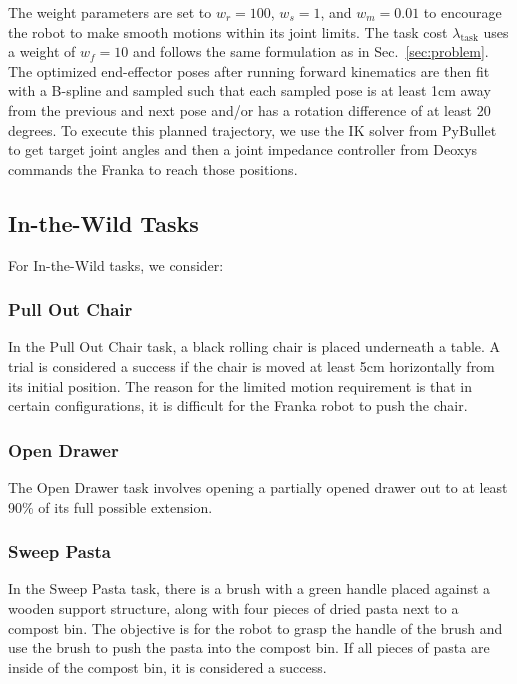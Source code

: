 The weight parameters are set to $w_r = 100$, $w_s = 1$, and $w_m = 0.01$ to encourage the robot to make smooth motions within its joint limits. The task cost $\lambda_{\text{task}}$ uses a weight of $w_f = 10$ and follows the same formulation as in Sec.~\ref{sec:problem}. The optimized end-effector poses after running forward kinematics are then fit with a B-spline and sampled such that each sampled pose is at least 1cm away from the previous and next pose and/or has a rotation difference of at least 20 degrees. To execute this planned trajectory, we use the IK solver from PyBullet~\cite{coumans2021pybullet} to get target joint angles and then a joint impedance controller from Deoxys~\cite{zhu2022viola} commands the Franka to reach those positions. 

\subsection{In-the-Wild Tasks}
\label{sec:in_the_wild_desc}

For In-the-Wild tasks, we consider:

\subsubsection{Pull Out Chair} 
In the Pull Out Chair task, a black rolling chair is placed underneath a table. 
A trial is considered a success if the chair is moved at least 5cm horizontally from its initial position. The reason for the limited motion requirement is that in certain configurations, it is difficult for the Franka robot to push the chair. 

\subsubsection{Open Drawer}
The Open Drawer task involves opening a partially opened drawer out to at least 90\% of its full possible extension. 

\subsubsection{Sweep Pasta}
In the Sweep Pasta task, there is a brush with a green handle placed against a wooden support structure, along with four pieces of dried pasta next to a compost bin. The objective is for the robot to grasp the handle of the brush and use the brush to push the pasta into the compost bin. If all pieces of pasta are inside of the compost bin, it is considered a success.  

